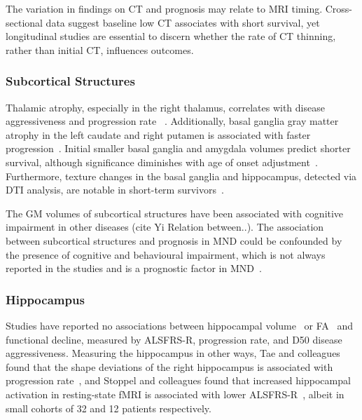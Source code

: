 The variation in findings on CT and prognosis may relate to MRI timing.
Cross-sectional data suggest baseline low CT associates with short survival, yet longitudinal studies are essential to discern whether the rate of CT thinning, rather than initial CT, influences outcomes.

\subsubsection*{Subcortical Structures}

Thalamic atrophy, especially in the right thalamus, correlates with disease aggressiveness and progression rate ~\cite{dieckmannCorticalSubcorticalGrey2022, johnsQuantifyingChangesSusceptibility2019}.
Additionally, basal ganglia gray matter atrophy in the left caudate and right putamen is associated with faster progression~\cite{sendaStructuralMRICorrelates2017, agostaLongitudinalAssessmentGrey2009}.
Initial smaller basal ganglia and amygdala volumes predict shorter survival, although significance diminishes with age of onset adjustment~\cite{westenengSubcorticalStructuresAmyotrophic2015}.
Furthermore, texture changes in the basal ganglia and hippocampus, detected via DTI analysis, are notable in short-term survivors~\cite{ishaqueEvaluatingCerebralCorrelates2018}.

The GM volumes of subcortical structures have been associated with cognitive impairment in other diseases (cite Yi Relation between..).
The association between subcortical structures and prognosis in MND could be confounded by the presence of cognitive and behavioural impairment, which is not always reported in the studies and is a prognostic factor in MND~\cite{suPredictorsSurvivalPatients2021}.

\subsubsection*{Hippocampus}
Studies have reported no associations between hippocampal volume~\cite{abdullaHippocampalDegenerationPatients2014, dieckmannCorticalSubcorticalGrey2022} or FA~\cite{mullerLargescaleMulticentreCerebral2016} and functional decline, measured by ALSFRS-R, progression rate, and D50 disease aggressiveness.
Measuring the hippocampus in other ways, Tae and colleagues found that the shape deviations of the right hippocampus is associated with progression rate~\cite{taeShapeAnalysisSubcortical2020}, and Stoppel and colleagues found that increased hippocampal activation in resting-state fMRI is associated with lower ALSFRS-R~\cite{stoppelStructuralFunctionalHallmarks2014}, albeit in small cohorts of 32 and 12 patients respectively.

